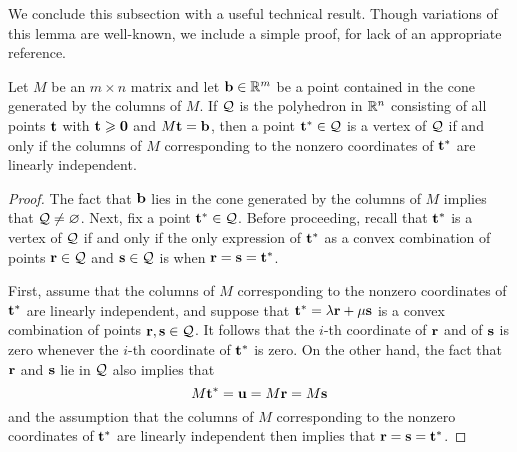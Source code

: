 \documentclass[11pt]{amsart}
\renewcommand{\!}[1]{{\color{red}\text{$\star$\,}#1\,$\star$}}
\begin{document}
We conclude this subsection with a useful technical result.  Though variations of this lemma are well-known, we include a simple proof, for lack of an appropriate reference.


\begin{lemma}  
\label{vertex: L}
Let $M$ be an $m \times n$ matrix and let $\mathbf{b} \in \mathbb{R}^m$ be a point contained in the cone generated by the columns of $M$.  If $\mathcal{Q}$ is the polyhedron in $\mathbb{R}^n$  consisting of all points $\mathbf{t}$ with $\mathbf{t} \geqslant \mathbf{0}$ and $M \mathbf{t} = \mathbf{b}$, then a point $\mathbf{t}^{\ast} \in \mathcal{Q}$ is a vertex of $\mathcal{Q}$ if and only if the columns of $M$ corresponding to the nonzero coordinates of $\mathbf{t}^{\ast}$ are linearly independent.  %
\end{lemma}

\begin{proof}  The fact that $\mathbf{b}$ lies in the cone generated by the columns of $M$ implies that $\mathcal{Q} \neq  \varnothing$.  Next, fix a point $\mathbf{t}^{\ast} \in \mathcal{Q}$.  Before proceeding, recall that $\mathbf{t}^{\ast}$ is a vertex of $\mathcal{Q}$ if and only if the only expression of $\mathbf{t}^{\ast}$ as a convex combination of points $\mathbf{r} \in \mathcal{Q}$ and $\mathbf{s} \in \mathcal{Q}$ is when $\mathbf{r}=\mathbf{s}=\mathbf{t}^{\ast}$.

First, assume that the columns of $M$ corresponding to the nonzero coordinates of $\mathbf{t}^{\ast}$ are linearly independent, and suppose that $\mathbf{t}^{\ast} = \lambda \mathbf{r} + \mu \mathbf{s}$ is a convex combination of points $\mathbf{r}, \mathbf{s} \in \mathcal{Q}$.  It follows that the $i$-th coordinate of $\mathbf{r}$ and of $\mathbf{s}$ is zero whenever the $i$-th coordinate of $\mathbf{t}^{\ast}$ is zero.  On the other hand, the fact that $\mathbf{r}$ and $\mathbf{s}$ lie in $\mathcal{Q}$ also implies that 
\[ M \mathbf{t}^{\ast} = \mathbf{u} = M \mathbf{r} = M \mathbf{s} \] 
and the assumption that the columns of $M$ corresponding to the nonzero coordinates of $\mathbf{t}^{\ast}$ are linearly independent then implies that $\mathbf{r}=\mathbf{s}=\mathbf{t}^{\ast}$.


\end{proof}
\end{document}
